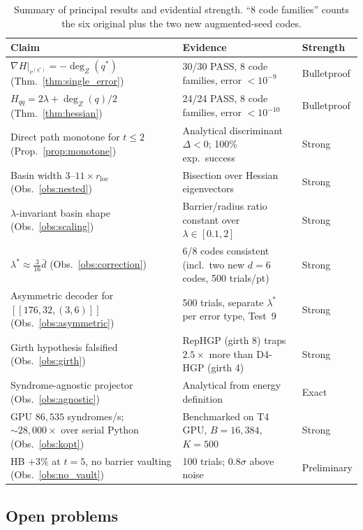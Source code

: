 \documentclass[12pt,a4paper]{article}
\theoremstyle{plain}
\theoremstyle{definition}
\theoremstyle{remark}
\newcommand{\dZ}{\operatorname{deg}_Z}
\begin{document}
\begin{table}[ht]
\centering
\caption{Summary of principal results and evidential strength.
  ``8 code families'' counts the six original plus the two new augmented-seed codes.}
\label{tab:summary}
\small
\begin{tabular}{p{5.5cm}p{5cm}l}
\toprule
Claim & Evidence & Strength \\
\midrule
$\nabla H|_{v^{(q^*)}} = -\dZ(q^*)$ (Thm.~\ref{thm:single_error})
& 30/30 PASS, 8 code families, error $<10^{-9}$
& Bulletproof \\[3pt]
$H_{qq} = 2\lambda + \dZ(q)/2$ (Thm.~\ref{thm:hessian})
& 24/24 PASS, 8 code families, error $<10^{-10}$
& Bulletproof \\[3pt]
Direct path monotone for $t\leq 2$ (Prop.~\ref{prop:monotone})
& Analytical discriminant $\Delta < 0$; 100\% exp.\ success
& Strong \\[3pt]
Basin width $3$--$11\times r_{\mathrm{loc}}$ (Obs.~\ref{obs:nested})
& Bisection over Hessian eigenvectors
& Strong \\[3pt]
$\lambda$-invariant basin shape (Obs.~\ref{obs:scaling})
& Barrier/radius ratio constant over $\lambda \in [0.1,2]$
& Strong \\[3pt]
$\lambda^* \approx \tfrac{3}{16}\bar{d}$ (Obs.~\ref{obs:correction})
& 6/8 codes consistent (incl.\ two new $d=6$ codes, 500 trials/pt)
& Strong \\[3pt]
Asymmetric decoder for $[[176,32,(3,6)]]$ (Obs.~\ref{obs:asymmetric})
& 500 trials, separate $\lambda^*$ per error type, Test~9
& Strong \\[3pt]
Girth hypothesis falsified (Obs.~\ref{obs:girth})
& RepHGP (girth 8) traps $2.5\times$ more than D4-HGP (girth 4)
& Strong \\[3pt]
Syndrome-agnostic projector (Obs.~\ref{obs:agnostic})
& Analytical from energy definition
& Exact \\[3pt]
GPU $86{,}535$ syndromes/s; $\sim 28{,}000\times$ over serial Python (Obs.~\ref{obs:kopt})
& Benchmarked on T4 GPU, $B=16{,}384$, $K=500$
& Strong \\[3pt]
HB $+3\%$ at $t=5$, no barrier vaulting (Obs.~\ref{obs:no_vault})
& 100 trials; $0.8\sigma$ above noise
& Preliminary \\
\bottomrule
\end{tabular}
\end{table}

\subsection{Open problems}
\end{document}
